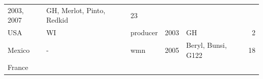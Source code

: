 \begin{longtable}[]{@{}lllrlr@{}}
\begin{minipage}[t]{0.19\columnwidth}
2003, 2007\strut
\end{minipage} & \begin{minipage}[t]{0.29\columnwidth}\raggedright\strut
GH, Merlot, Pinto, Redkid\strut
\end{minipage} & \begin{minipage}[t]{0.04\columnwidth}\raggedleft\strut
23\strut
\end{minipage}\tabularnewline
\begin{minipage}[t]{0.11\columnwidth}\raggedright\strut
USA\strut
\end{minipage} & \begin{minipage}[t]{0.08\columnwidth}\raggedright\strut
WI\strut
\end{minipage} & \begin{minipage}[t]{0.12\columnwidth}\raggedright\strut
producer\strut
\end{minipage} & \begin{minipage}[t]{0.19\columnwidth}\raggedleft\strut
2003\strut
\end{minipage} & \begin{minipage}[t]{0.29\columnwidth}\raggedright\strut
GH\strut
\end{minipage} & \begin{minipage}[t]{0.04\columnwidth}\raggedleft\strut
2\strut
\end{minipage}\tabularnewline
\begin{minipage}[t]{0.11\columnwidth}\raggedright\strut
Mexico\strut
\end{minipage} & \begin{minipage}[t]{0.08\columnwidth}\raggedright\strut
-\strut
\end{minipage} & \begin{minipage}[t]{0.12\columnwidth}\raggedright\strut
wmn\strut
\end{minipage} & \begin{minipage}[t]{0.19\columnwidth}\raggedleft\strut
2005\strut
\end{minipage} & \begin{minipage}[t]{0.29\columnwidth}\raggedright\strut
Beryl, Bunsi, G122\strut
\end{minipage} & \begin{minipage}[t]{0.04\columnwidth}\raggedleft\strut
18\strut
\end{minipage}\tabularnewline
\begin{minipage}[t]{0.11\columnwidth}\raggedright\strut
France\strut
\end{minipage} & \begin{minipage}[t]{0.08\columnwidth}\raggedright\strut

\end{minipage}
\end{longtable}
